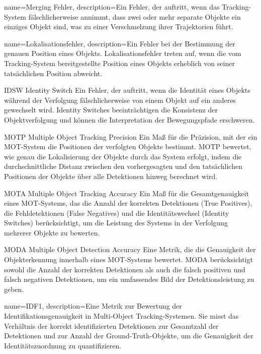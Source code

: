 {
name=Merging Fehler,
description={Ein Fehler, der auftritt, wenn das Tracking-System fälschlicherweise annimmt, dass zwei oder mehr separate Objekte ein einziges Objekt sind, was zu einer Verschmelzung ihrer Trajektorien führt.}
}

{
name=Lokalisationsfehler,
description={Ein Fehler bei der Bestimmung der genauen Position eines Objekts. Lokalisationsfehler treten auf, wenn die vom Tracking-System bereitgestellte Position eines Objekts erheblich von seiner tatsächlichen Position abweicht.}
}

\newglossaryentrywithacronym
{IDSW}
{Identity Switch}
{Ein Fehler, der auftritt, wenn die Identität eines Objekts während der Verfolgung fälschlicherweise von einem Objekt auf ein anderes gewechselt wird. Identity Switches beeinträchtigen die Konsistenz der Objektverfolgung und können die Interpretation der Bewegungspfade erschweren.}


\newglossaryentrywithacronym
{MOTP}
{Multiple Object Tracking Precision}
{Ein Maß für die Präzision, mit der ein MOT-System die Positionen der verfolgten Objekte bestimmt. MOTP bewertet, wie genau die Lokalisierung der Objekte durch das System erfolgt, indem die durchschnittliche Distanz zwischen den vorhergesagten und den tatsächlichen Positionen der Objekte über alle Detektionen hinweg berechnet wird.}

\newglossaryentrywithacronym
{MOTA}
{Multiple Object Tracking Accuracy}
{Ein Maß für die Gesamtgenauigkeit eines MOT-Systems, das die Anzahl der korrekten Detektionen (True Positives), die Fehldetektionen (False Negatives) und die Identitätswechsel (Identity Switches) berücksichtigt, um die Leistung des Systems in der Verfolgung mehrerer Objekte zu bewerten.}

\newglossaryentrywithacronym
{MODA}
{Multiple Object Detection Accuracy}
{Eine Metrik, die die Genauigkeit der Objekterkennung innerhalb eines MOT-Systems bewertet. MODA berücksichtigt sowohl die Anzahl der korrekten Detektionen als auch die falsch positiven und falsch negativen Detektionen, um ein umfassendes Bild der Detektionsleistung zu geben.}

{
name=IDF1,
description={Eine Metrik zur Bewertung der Identifikationsgenauigkeit in Multi-Object Tracking-Systemen. Sie misst das Verhältnis der korrekt identifizierten Detektionen zur Gesamtzahl der Detektionen und zur Anzahl der Ground-Truth-Objekte, um die Genauigkeit der Identitätszuordnung zu quantifizieren.}
}

